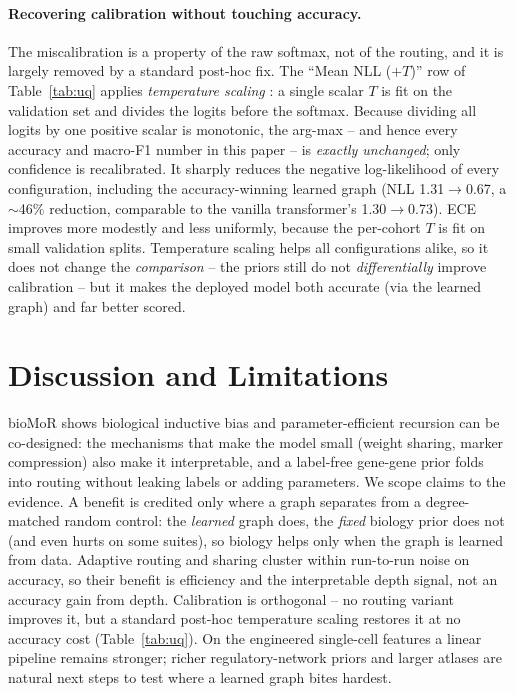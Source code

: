 \documentclass[letterpaper]{article}
\begin{document}
\paragraph{Recovering calibration without touching accuracy.}
The miscalibration is a property of the raw softmax, not of the routing, and it is
largely removed by a standard post-hoc fix. The ``Mean NLL ($+T$)'' row of Table~\ref{tab:uq}
applies \emph{temperature scaling} \cite{guo2017calibration}: a single scalar $T$ is fit on
the validation set and divides the logits before the softmax. Because dividing all logits
by one positive scalar is monotonic, the arg-max -- and hence every accuracy and macro-F1
number in this paper -- is \emph{exactly unchanged}; only confidence is recalibrated. It
sharply reduces the negative log-likelihood of every configuration, including the
accuracy-winning learned graph (NLL 1.31$\to$0.67, a
$\sim$46\% reduction, comparable to the vanilla transformer's
1.30$\to$0.73). ECE improves more modestly and less uniformly,
because the per-cohort $T$ is fit on small validation splits. Temperature scaling helps
all configurations alike, so it does not change the \emph{comparison} -- the priors still
do not \emph{differentially} improve calibration -- but it makes the deployed model both
accurate (via the learned graph) and far better scored.


\section{Discussion and Limitations}
bioMoR shows biological inductive bias and parameter-efficient recursion can be co-designed:
the mechanisms that make the model small (weight sharing, marker compression) also make it
interpretable, and a label-free gene-gene prior folds into routing without leaking labels or
adding parameters. We scope claims to the evidence. A benefit is credited only where a graph
separates from a degree-matched random control: the \emph{learned} graph does, the
\emph{fixed} biology prior does not (and even hurts on some suites), so biology helps only
when the graph is learned from data. Adaptive routing and sharing cluster within run-to-run
noise on accuracy, so their benefit is efficiency and the interpretable depth signal, not an
accuracy gain from depth. Calibration is orthogonal -- no routing variant improves it, but a
standard post-hoc temperature scaling restores it at no accuracy cost (Table~\ref{tab:uq}).
On the engineered single-cell features a linear pipeline remains stronger; richer
regulatory-network priors and larger atlases are natural next steps to test where a learned
graph bites hardest.
\end{document}

